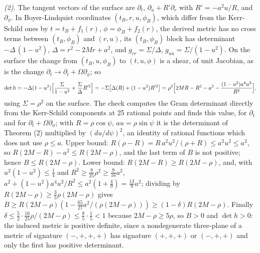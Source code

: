 \emph{(2).} The tangent vectors of the surface are $\partial_{t}$, $\partial_{u} + R'\partial_{r}$ with $R' = -a^{2}u/R$, and $\partial_{\phi}$. In Boyer-Lindquist coordinates $(t_{B}, r, u, \phi_{B})$, which differ from the Kerr-Schild ones by $t = t_{B} + f_{1}(r)$, $\phi = \phi_{B} + f_{2}(r)$, the derived metric has no cross terms between $(t_{B}, \phi_{B})$ and $(r, u)$, its $(t_{B}, \phi_{B})$ block has determinant $-\Delta\,(1 - u^{2})$, $\Delta = r^{2} - 2Mr + a^{2}$, and $g_{rr} = \Sigma/\Delta$, $g_{uu} = \Sigma/(1 - u^{2})$. On the surface the change from $(t_{B}, u, \phi_{B})$ to $(t, u, \phi)$ is a shear, of unit Jacobian, as is the change $\partial_{t} \to \partial_{t} + \Omega\partial_{\phi}$; so
\[
\det h = -\Delta(1 - u^{2})\Bigl[\frac{\Sigma}{1 - u^{2}} + \frac{\Sigma}{\Delta}R'^{2}\Bigr] = -\Sigma\bigl[\Delta(R) + (1 - u^{2})R'^{2}\bigr] = \rho^{2}\Bigl[2MR - R^{2} - a^{2} - \frac{(1 - u^{2})a^{4}u^{2}}{R^{2}}\Bigr],
\]
using $\Sigma = \rho^{2}$ on the surface. The check computes the Gram determinant directly from the Kerr-Schild components at 25 rational points and finds this value, for $\partial_{t}$ and for $\partial_{t} + \Omega\partial_{\phi}$; with $R = \rho\cos\psi$, $au = \rho\sin\psi$ it is the determinant of Theorem (2) multiplied by $(du/d\psi)^{2}$, an identity of rational functions which does not use $\rho \le a$. Upper bound: $R(\rho - R) = R\,a^{2}u^{2}/(\rho + R) \le a^{2}u^{2} \le a^{2}$, so $R(2M - R) - a^{2} \le R(2M - \rho)$, and the last term of $B$ is not positive; hence $B \le R(2M - \rho)$. Lower bound: $R(2M - R) \ge R(2M - \rho)$, and, with $u^{2}(1 - u^{2}) \le \tfrac14$ and $R^{2} \ge \tfrac{9}{25}\rho^{2} \ge \tfrac{9}{16}a^{2}$, $a^{2} + (1 - u^{2})a^{4}u^{2}/R^{2} \le a^{2}(1 + \tfrac49) = \tfrac{13}{9}a^{2}$; dividing by $R(2M - \rho) \ge \tfrac35\rho(2M - \rho)$ gives $B \ge R(2M - \rho)(1 - \tfrac{65}{27}a^{2}/(\rho(2M - \rho))) \ge (1 - \delta)R(2M - \rho)$. Finally $\delta \le \tfrac52\cdot\tfrac{16}{25}\rho/(2M - \rho) \le \tfrac85\cdot\tfrac15 < 1$ because $2M - \rho \ge 5\rho$, so $B > 0$ and $\det h > 0$: the induced metric is positive definite, since a nondegenerate three-plane of a metric of signature $(-,+,+,+)$ has signature $(+,+,+)$ or $(-,+,+)$ and only the first has positive determinant.

